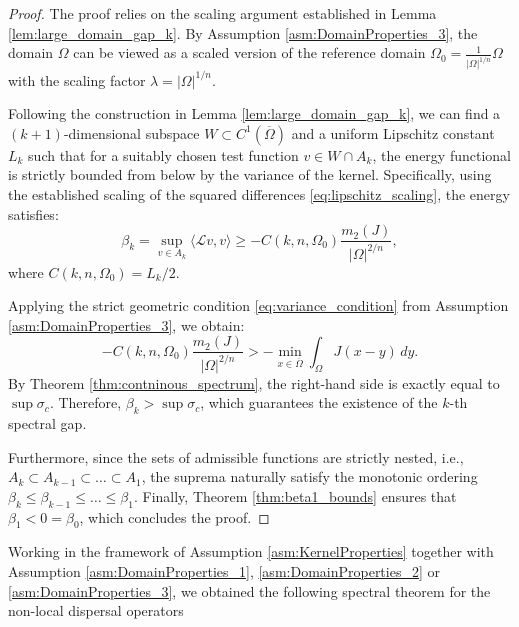 \documentclass[12pt, a4paper]{article}
\theoremstyle{break}
\theoremstyle{break}
\theoremstyle{break}
\theoremstyle{break}
\theoremstyle{break}
\theoremstyle{break}
\theoremstyle{break}
\theoremstyle{break}
\theoremstyle{break}
\begin{document}
\begin{proof}
    The proof relies on the scaling argument established in Lemma \ref{lem:large_domain_gap_k}. By Assumption \ref{asm:DomainProperties_3}, the domain $\Omega$ can be viewed as a scaled version of the reference domain $\Omega_0 = \frac{1}{|\Omega|^{1/n}}\Omega$ with the scaling factor $\lambda = |\Omega|^{1/n}$. 
    
    Following the construction in Lemma \ref{lem:large_domain_gap_k}, we can find a $(k+1)$-dimensional subspace $W \subset C^1(\overline{\Omega})$ and a uniform Lipschitz constant $L_k$ such that for a suitably chosen test function $v \in W \cap A_k$, the energy functional is strictly bounded from below by the variance of the kernel. Specifically, using the established scaling of the squared differences \eqref{eq:lipschitz_scaling}, the energy satisfies:
    \begin{equation*}
        \beta_k = \sup_{v \in A_k} \langle \mathcal{L}v, v \rangle \geq - C(k,n,\Omega_0) \frac{m_2(J)}{|\Omega|^{2/n}},
    \end{equation*}
    where $C(k,n,\Omega_0) = L_k / 2$. 
    
    Applying the strict geometric condition \eqref{eq:variance_condition} from Assumption \ref{asm:DomainProperties_3}, we obtain:
    \begin{equation*}
        - C(k,n,\Omega_0) \frac{m_2(J)}{|\Omega|^{2/n}} > -\min_{x \in \overline{\Omega}} \int_\Omega J(x-y) \, dy.
    \end{equation*}
    By Theorem \ref{thm:contninous_spectrum}, the right-hand side is exactly equal to $\sup \sigma_c$. Therefore, $\beta_k > \sup \sigma_c$, which guarantees the existence of the $k$-th spectral gap. 

    Furthermore, since the sets of admissible functions are strictly nested, i.e., $A_k \subset A_{k-1} \subset \dots \subset A_1$, the suprema naturally satisfy the monotonic ordering $\beta_k \leq \beta_{k-1} \leq \dots \leq \beta_1$. Finally, Theorem \ref{thm:beta1_bounds} ensures that $\beta_1 < 0 = \beta_0$, which concludes the proof.
\end{proof}

Working in the framework of Assumption \ref{asm:KernelProperties} together with Assumption \ref{asm:DomainProperties_1}, \ref{asm:DomainProperties_2} or \ref{asm:DomainProperties_3}, we obtained the following spectral theorem for the non-local dispersal operators
\end{document}

